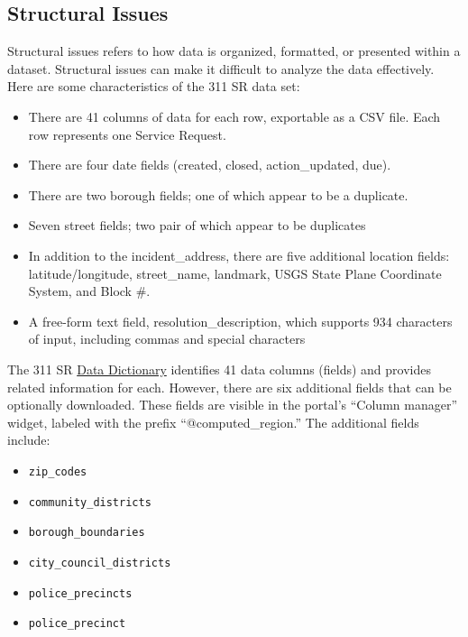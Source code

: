 \documentclass[linenumber]{jdsart}
\begin{document}
\subsection{Structural Issues}
\label{sec:structural}

Structural issues refers to how data is organized, formatted, 
or presented within a dataset. Structural issues can make 
it difficult to analyze the data effectively. Here are some 
characteristics of the 311 SR data set:

\begin{itemize}
	\item There are 41 columns of data for each row, exportable as a CSV file.
	Each row represents one Service Request. 
	
	\item There are four date fields (created, closed, action\_updated, due).
	
	\item There are two borough fields; one of which appear to be a duplicate.
		
	\item Seven street fields; two pair of which appear to be duplicates
	
	\item In addition to the incident\_address, there are five additional location fields: 
	latitude/longitude, street\_name, landmark, USGS State Plane 
	Coordinate System, and Block \#.
	
	\item A free-form text field, resolution\_description, which 
	supports 934 characters of input, including commas and special characters
\end{itemize}

The 311 SR 
\href{https://data.cityofnewyork.us/api/views/erm2-nwe9/files/b372b884-f86a-453b-ba16-1fe06ce9d212?download=true&filename=311_ServiceRequest_2010-Present_DataDictionary_Updated_2023.xlsx}{Data Dictionary} 
identifies 41 data columns (fields) and provides related information 
for each. However, there are six additional fields that can be
optionally downloaded. These fields are 
visible in the portal's ``Column manager'' widget, labeled with the prefix 
``@computed\_region.'' The additional fields include:

\begin{itemize}
    \item \texttt{zip\_codes}
    \item \texttt{community\_districts}
    \item \texttt{borough\_boundaries}
    \item \texttt{city\_council\_districts}
    \item \texttt{police\_precincts}
    \item \texttt{police\_precinct}
\end{itemize}
\end{document}
